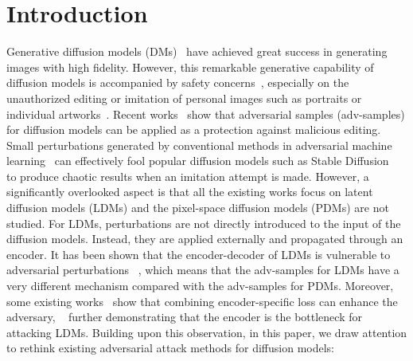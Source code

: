 \documentclass{article}
\begin{document}
\begin{abstract}







\end{abstract}


\section{Introduction}

Generative diffusion models (DMs)~\citep{ddpm,song2020score,ldm} have achieved great success in generating images with high fidelity. However, this remarkable generative capability of diffusion models is accompanied by safety concerns~\cite{zhang2023text}, especially on the unauthorized editing or imitation of personal images such as portraits or individual artworks~\cite{andersen2023,setty2023}.
%
Recent works~\cite{advdm, glaze,salman2023raising, sdsattack, mist-v2, chen2024smoothattack,ahn2024imperceptible, metacloak} show that adversarial samples (adv-samples) for diffusion models can be applied as a protection against malicious editing. Small perturbations generated by conventional methods in adversarial machine learning~\citep{pgd,goodfellow2014fgsm} can effectively fool popular diffusion models such as Stable Diffusion~\cite{ldm} to produce chaotic results when an imitation attempt is made. However, a significantly overlooked aspect is that all the existing works focus on latent diffusion models (LDMs) and the pixel-space diffusion models (PDMs) are not studied. For LDMs, perturbations are not directly introduced to the input of the diffusion models. Instead, they are applied externally and propagated through an encoder. It has been shown that the encoder-decoder of LDMs is vulnerable to adversarial perturbations ~\cite{zhang2023robustness,sdsattack}, which means that the adv-samples for LDMs have a very different mechanism compared with the adv-samples for PDMs. 
Moreover, some existing works~\cite{liang2023mist, salman2023raising} show that combining encoder-specific loss can enhance the adversary, ~\cite{sdsattack} further demonstrating that 
the encoder is the bottleneck for attacking LDMs. Building upon this observation, in this paper, we draw attention to
rethink existing adversarial attack methods for diffusion models:
\end{document}
